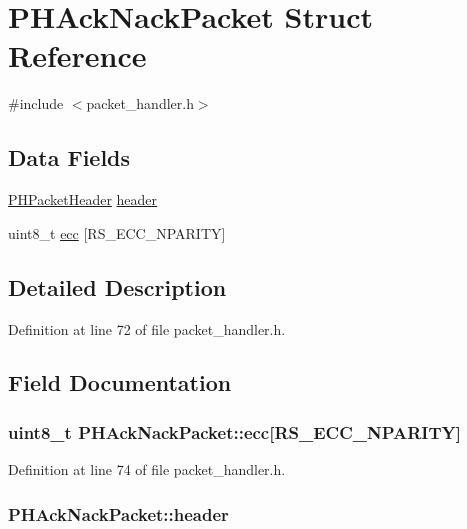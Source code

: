 \hypertarget{struct_p_h_ack_nack_packet}{\section{\-P\-H\-Ack\-Nack\-Packet \-Struct \-Reference}
\label{struct_p_h_ack_nack_packet}
}


{\ttfamily \#include $<$packet\-\_\-handler.\-h$>$}

\subsection*{\-Data \-Fields}
\begin{DoxyCompactItemize}
\item 
\hyperlink{struct_p_h_packet_header}{\-P\-H\-Packet\-Header} \hyperlink{struct_p_h_ack_nack_packet_aac07270becd441ff9dafa3e01945883c}{header}
\item 
uint8\-\_\-t \hyperlink{struct_p_h_ack_nack_packet_a362bb5e45f310d81a10a2bdfa8108ce8}{ecc} \mbox{[}\-R\-S\-\_\-\-E\-C\-C\-\_\-\-N\-P\-A\-R\-I\-T\-Y\mbox{]}
\end{DoxyCompactItemize}


\subsection{\-Detailed \-Description}


\-Definition at line 72 of file packet\-\_\-handler.\-h.



\subsection{\-Field \-Documentation}
\hypertarget{struct_p_h_ack_nack_packet_a362bb5e45f310d81a10a2bdfa8108ce8}{
\subsubsection[{ecc}]{\setlength{\rightskip}{0pt plus 5cm}uint8\-\_\-t {\bf \-P\-H\-Ack\-Nack\-Packet\-::ecc}\mbox{[}\-R\-S\-\_\-\-E\-C\-C\-\_\-\-N\-P\-A\-R\-I\-T\-Y\mbox{]}}}\label{struct_p_h_ack_nack_packet_a362bb5e45f310d81a10a2bdfa8108ce8}


\-Definition at line 74 of file packet\-\_\-handler.\-h.

\hypertarget{struct_p_h_ack_nack_packet_aac07270becd441ff9dafa3e01945883c}{
\subsubsection[{header}]{ {\bf \-P\-H\-Ack\-Nack\-Packet\-::header}}}\label{struct_p_h_ack_nack_packet_aac07270becd441ff9dafa3e01945883c}


